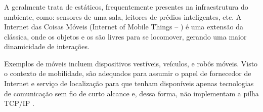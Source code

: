 \subsubsection{\iomt{}}

A \iot{} geralmente trata de \smartobjs{} estáticos, frequentemente presentes na infraestrutura do ambiente, como: sensores de uma sala, leitores \rfid{} de prédios inteligentes, etc. A Internet das Coisas Móveis (Internet of Mobile Things -- \iomt{}) é uma extensão da \iot{} clássica, onde os objetos e os \gateways{} são livres para se locomover, gerando uma maior dinamicidade de interações.

Exemplos de \smartobjs{} móveis incluem dispositivos vestíveis, veículos, e robôs móveis. Visto o contexto de mobilidade, \smartphones{} são adequados para assumir o papel de fornecedor de Internet e serviço de localização para \smartobjs{} que tenham disponíveis apenas tecnologias de comunicação sem fio de curto alcance e, dessa forma, não implementam a pilha TCP/IP \cite{talavera2015mobile}.

